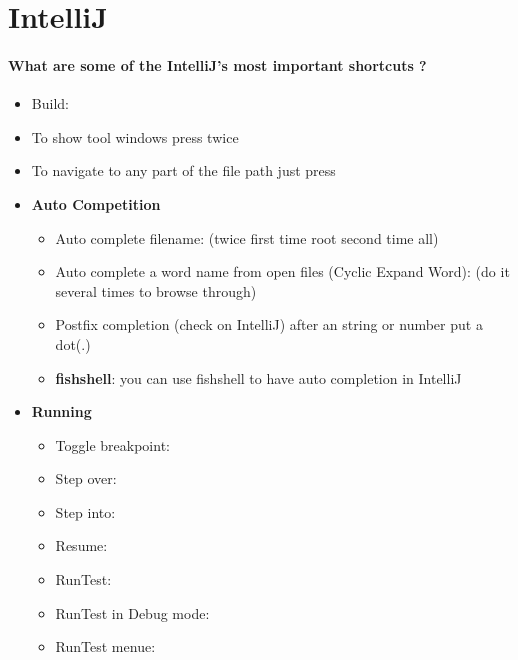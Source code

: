 \section{IntelliJ}

\paragraph{What are some of the IntelliJ's most important shortcuts ?}

\begin{itemize}
	\item Build: 
	\item To show tool windows press  twice
	\item To navigate to any part of the file path just press 
	\item \textbf{Auto Competition}
	\begin{itemize}
		\item Auto complete filename:  (twice first time root second time all)
		\item Auto complete a word name from open files (Cyclic Expand Word):  (do it several times to browse through)
		\item Postfix completion (check on IntelliJ) after an string or number put a dot(.) 
		\item \textbf{fishshell}: you can use fishshell to have auto completion in IntelliJ
	\end{itemize}

	\item \textbf{Running}
	\begin{itemize}
		\item Toggle breakpoint: 
		\item Step over: 
		\item Step into: 
		\item Resume: 
		\item RunTest: 
		\item RunTest in Debug mode: 
		\item RunTest menue: 
	\end{itemize}


\end{itemize}
